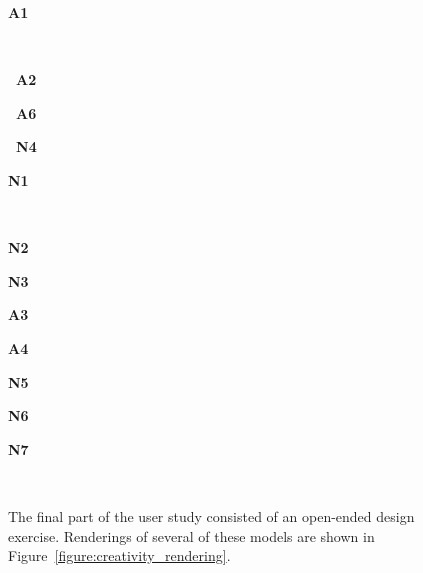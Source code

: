 \begin{figure}[t]
\begin{small}
\begin{minipage}{0.14\textwidth}{\bf A1}\end{minipage}
\vspace{0.065\textwidth}
\\
\begin{minipage}{0.28\textwidth}{\bf ~A2}\end{minipage}
\begin{minipage}{0.28\textwidth}{\bf ~A6}\end{minipage}
\begin{minipage}{0.28\textwidth}{\bf ~N4}\end{minipage}
\begin{minipage}{0.14\textwidth}{\bf N1}\end{minipage}
\vspace{0.065\textwidth}
\\
\begin{minipage}{0.14\textwidth}{\bf N2}\end{minipage}%
\begin{minipage}{0.14\textwidth}{\bf N3}\end{minipage}%
\begin{minipage}{0.14\textwidth}{\bf A3}\end{minipage}%
\begin{minipage}{0.14\textwidth}{\bf A4}\end{minipage}%
\begin{minipage}{0.14\textwidth}{\bf N5}\end{minipage}%
\begin{minipage}{0.14\textwidth}{\bf N6}\end{minipage}%
\begin{minipage}{0.14\textwidth}{\bf N7}\end{minipage}\vspace{-0.15in}\\
\end{small}
  \caption{The final part of the user study consisted of an open-ended
    design exercise.  Renderings of several of these models are shown in Figure~\ref{figure:creativity_rendering}.
    \label{figure:new_designs}
    }
\vspace{-0.1in}

\end{figure}
